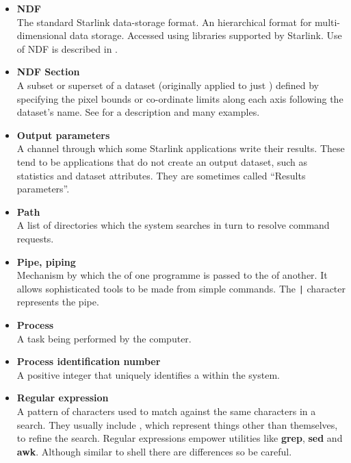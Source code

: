 \begin{itemize}
\item {\bf\label{sc4_gl_ndf}NDF}\\
      The standard Starlink data-storage format.  An hierarchical format for
      multi-dimensional data storage.  Accessed using libraries supported
      by Starlink.  Use of NDF is described in .

\item {\bf\label{sc4_gl_ndf_se}NDF Section}\\
      A subset or superset of a dataset (originally applied to just
      ) defined by specifying the pixel bounds
      or co-ordinate limits along each axis following the dataset's name.
      See  for a description
      and many examples.

\item {\bf\label{sc4_gl_opar}Output parameters}\\
      A channel through which some Starlink applications write their
      results.  These tend to be applications that do not create an
      output dataset, such as statistics and dataset attributes.  They
      are sometimes called ``Results parameters''.

\item {\bf\label{sc4_gl_path}Path}\\
      A list of directories which the system searches in turn to
      resolve command requests.

\item {\bf\label{sc4_gl_pipe}Pipe, piping}\\
      Mechanism by which the 
      of one programme is passed to the  of another.  It allows sophisticated tools
      to be made from simple commands.  The {\tt |} character
      represents the pipe.

\item {\bf\label{sc4_gl_pro}Process}\\
      A task being performed by the computer.

\item {\bf\label{sc4_gl_pid}Process identification number}\\
      A positive integer that uniquely identifies a
       within the system.

\item {\bf\label{sc4_gl_reg_exp}Regular expression}\\
      A pattern of characters used to match against the same
      characters in a search.  They usually include , which represent things other than
      themselves, to refine the search.  Regular expressions empower
      utilities like {\bf grep}, {\bf sed} and {\bf awk}.  Although
      similar to shell  there are
      differences so be careful.


\end{itemize}
